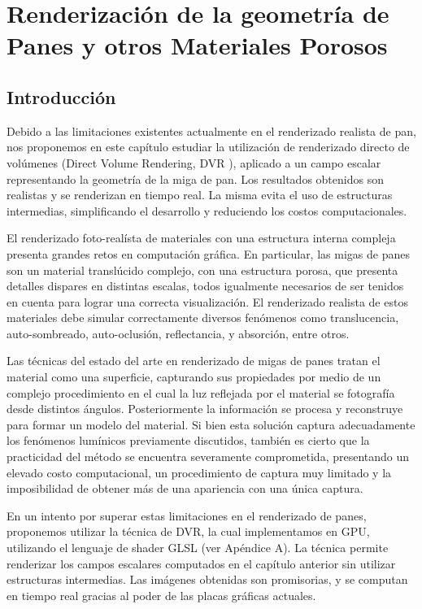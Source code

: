 
\chapter[Renderización de la geometría de Panes]{Renderización de la geometría de Panes y otros Materiales Porosos}
\section{Introducción}
Debido a las limitaciones existentes actualmente en el renderizado realista de pan, nos proponemos en este capítulo estudiar la utilización de renderizado directo de volúmenes (Direct Volume Rendering, \acrshort{DVR} \cite{Kratz2006}), aplicado a un campo escalar representando la geometría de la miga de pan. 
Los resultados obtenidos son realistas y se renderizan en tiempo real. La misma evita el uso de estructuras intermedias, simplificando el desarrollo y reduciendo los costos computacionales.

El renderizado foto-realísta de materiales con una estructura interna compleja presenta grandes retos en computación gráfica.
En particular, las migas de panes son un material translúcido complejo, con una estructura porosa, que presenta detalles dispares en distintas escalas, todos igualmente necesarios de ser tenidos en cuenta para lograr una correcta visualización.
El renderizado realista de estos materiales debe simular correctamente diversos fenómenos como translucencia, auto-sombreado, auto-oclusión, reflectancia, y absorción, entre otros.

Las técnicas del estado del arte en renderizado de migas de panes tratan el material como una superficie, capturando sus propiedades por medio de un complejo procedimiento en el cual la luz reflejada por el material se fotografía desde distintos ángulos.
Posteriormente la información se procesa y reconstruye para formar un modelo del material.
Si bien esta solución captura adecuadamente los fenómenos lumínicos previamente discutidos, también es cierto que la practicidad del método se encuentra severamente comprometida, presentando un elevado costo computacional, un procedimiento de captura muy limitado y la imposibilidad de obtener más de una apariencia con una única captura.

En un intento por superar estas limitaciones en el renderizado de panes, proponemos utilizar la técnica de DVR, la cual implementamos en \acrshort{GPU}, utilizando el lenguaje de shader GLSL (ver Apéndice A).
La técnica permite renderizar los campos escalares computados en el capítulo anterior sin utilizar estructuras intermedias.
Las imágenes obtenidas son promisorias, y se computan en tiempo real gracias al poder de las placas gráficas actuales.

